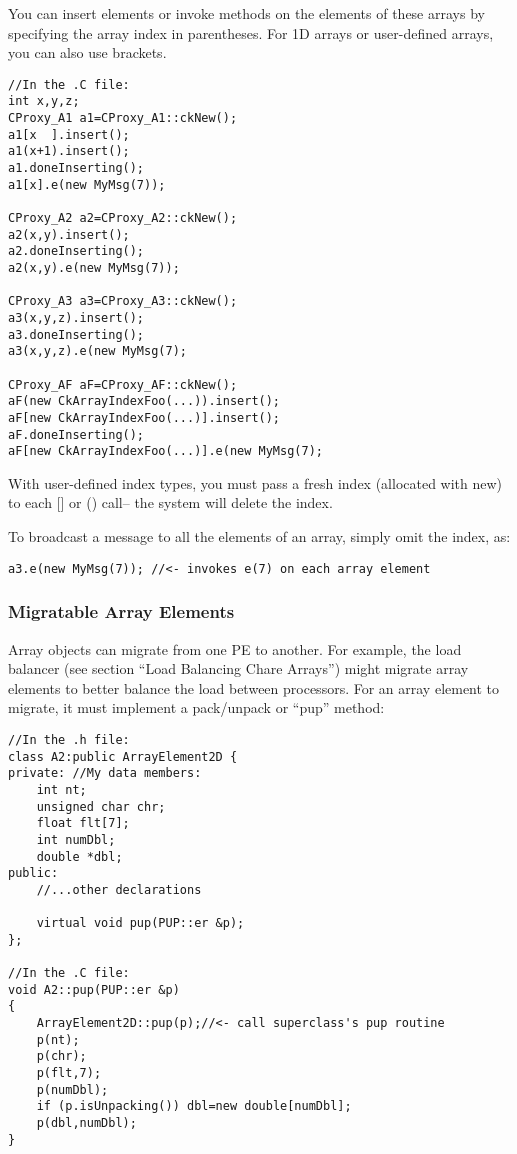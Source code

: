 You can insert elements or invoke methods on the elements of these
arrays by specifying the array index in parentheses.  For 1D 
arrays or user-defined arrays, you can also use brackets.

\begin{verbatim}
//In the .C file:
int x,y,z;
CProxy_A1 a1=CProxy_A1::ckNew();
a1[x  ].insert(); 
a1(x+1).insert();
a1.doneInserting();
a1[x].e(new MyMsg(7));

CProxy_A2 a2=CProxy_A2::ckNew(); 
a2(x,y).insert();
a2.doneInserting();
a2(x,y).e(new MyMsg(7));

CProxy_A3 a3=CProxy_A3::ckNew();
a3(x,y,z).insert();
a3.doneInserting();
a3(x,y,z).e(new MyMsg(7);

CProxy_AF aF=CProxy_AF::ckNew();
aF(new CkArrayIndexFoo(...)).insert();
aF[new CkArrayIndexFoo(...)].insert();
aF.doneInserting();
aF[new CkArrayIndexFoo(...)].e(new MyMsg(7);

\end{verbatim}
With user-defined index types, you must pass a fresh index 
(allocated with new) to each [] or () call-- the system will delete
the index.

To broadcast a message to all the elements of an array, simply omit the
index, as:

\begin{verbatim}
a3.e(new MyMsg(7)); //<- invokes e(7) on each array element
\end{verbatim}

\subsubsection{Migratable Array Elements}
Array objects can migrate from one PE to another.
For example, the load balancer (see section ``Load Balancing Chare Arrays'')
might migrate array elements to better balance the load between
processors.  For an array element to migrate, it must implement
a pack/unpack or ``pup'' method:

\begin{verbatim}
//In the .h file:
class A2:public ArrayElement2D {
private: //My data members:
    int nt;
    unsigned char chr;
    float flt[7];
    int numDbl;
    double *dbl;
public:	
    //...other declarations

    virtual void pup(PUP::er &p);
};

//In the .C file:
void A2::pup(PUP::er &p)
{
    ArrayElement2D::pup(p);//<- call superclass's pup routine
    p(nt);
    p(chr);
    p(flt,7);
    p(numDbl);
    if (p.isUnpacking()) dbl=new double[numDbl];
    p(dbl,numDbl);
}
\end{verbatim}

